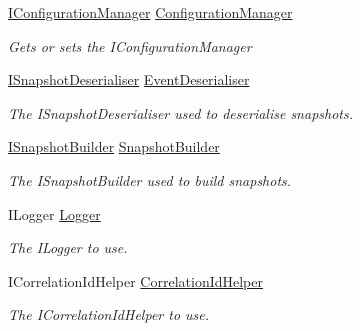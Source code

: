 \begin{DoxyCompactItemize}
\item 
\hyperlink{interfaceCqrs_1_1Configuration_1_1IConfigurationManager}{I\+Configuration\+Manager} \hyperlink{classCqrs_1_1Snapshots_1_1SnapshotStore_a4b408b56a060a5f4ab914d9c2751a7b5_a4b408b56a060a5f4ab914d9c2751a7b5}{Configuration\+Manager}
\begin{DoxyCompactList}\small\item\em Gets or sets the I\+Configuration\+Manager \end{DoxyCompactList}\item 
\hyperlink{interfaceCqrs_1_1Events_1_1ISnapshotDeserialiser}{I\+Snapshot\+Deserialiser} \hyperlink{classCqrs_1_1Snapshots_1_1SnapshotStore_a2cf3bd342de15231307f1d478297454f_a2cf3bd342de15231307f1d478297454f}{Event\+Deserialiser}
\begin{DoxyCompactList}\small\item\em The I\+Snapshot\+Deserialiser used to deserialise snapshots. \end{DoxyCompactList}\item 
\hyperlink{interfaceCqrs_1_1Events_1_1ISnapshotBuilder}{I\+Snapshot\+Builder} \hyperlink{classCqrs_1_1Snapshots_1_1SnapshotStore_a467ad1be01ccaaff23868a9ce4985746_a467ad1be01ccaaff23868a9ce4985746}{Snapshot\+Builder}
\begin{DoxyCompactList}\small\item\em The I\+Snapshot\+Builder used to build snapshots. \end{DoxyCompactList}\item 
I\+Logger \hyperlink{classCqrs_1_1Snapshots_1_1SnapshotStore_a41244ca79899540fe3ecccfd63ddc6f5_a41244ca79899540fe3ecccfd63ddc6f5}{Logger}
\begin{DoxyCompactList}\small\item\em The I\+Logger to use. \end{DoxyCompactList}\item 
I\+Correlation\+Id\+Helper \hyperlink{classCqrs_1_1Snapshots_1_1SnapshotStore_ac2191c50c03cb3ddfa574d6ad3e2a075_ac2191c50c03cb3ddfa574d6ad3e2a075}{Correlation\+Id\+Helper}
\begin{DoxyCompactList}\small\item\em The I\+Correlation\+Id\+Helper to use. \end{DoxyCompactList}\end{DoxyCompactItemize}


